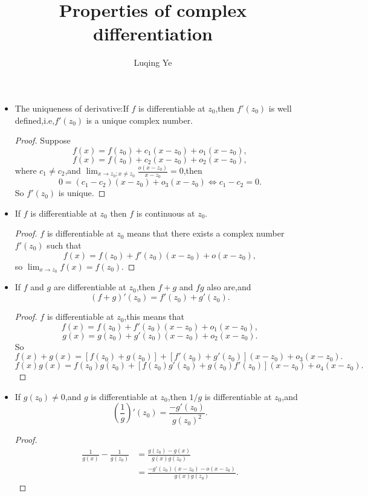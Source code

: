 \documentclass{amsart}
\theoremstyle{plain}
\theoremstyle{definition}
\begin{document}
\title{Properties of complex differentiation}

\author{Luqing Ye}
\address{College of Science, Hangzhou Normal University,Hangzhou City,Zhejiang Province,China}

\maketitle

\setcounter{tocdepth}{2}
\begin{itemize}
\item The uniqueness of derivative:If $f$ is differentiable at
  $z_0$,then $f'(z_0)$ is well defined,i.e,$f'(z_0)$ is a unique
  complex number.
  \begin{proof}
Suppose
$$
f(x)=f(z_0)+c_1(x-z_0)+o_1(x-z_0),
$$
$$
f(x)=f(z_0)+c_2(x-z_0)+o_2(x-z_0),
$$
where $c_1\neq c_2$,and $\lim_{x\to z_0;x\neq
  z_0}\frac{o(x-z_0)}{x-z_0}=0$,then 
$$
0=(c_1-c_2)(x-z_0)+o_3(x-z_0) \iff c_1-c_2=0.
$$
So $f'(z_0)$ is unique.
  \end{proof}
\item If $f$ is differentiable at $z_0$ then $f$ is continuous at
  $z_0$.
  \begin{proof}
    $f$ is differentiable at $z_0$ means that there exists a complex
    number $f'(z_0)$ such that
$$
f(x)=f(z_0)+f'(z_0) (x-z_0)+o(x-z_0),
$$
so
$\lim_{x\to z_0}f(x)=f(z_0)$.
  \end{proof}
\item If $f$ and $g$ are differentiable at $z_0$,then $f+g$ and $fg$
  also are,and 
$$
(f+g)'(z_0)=f'(z_0)+g'(z_0).
$$
\begin{proof}
  $f$ is differentiable at $z_0$,this means that
$$
f(x)=f(z_0)+f'(z_0)(x-z_0)+o_{1}(x-z_0),
$$
$$
g(x)=g(z_0)+g'(z_0)(x-z_0)+o_{2}(x-z_0).
$$
So
$$
f(x)+g(x)=[f(z_0)+g(z_0)]+[f'(z_0)+g'(z_0)](x-z_0)+o_3(x-z_0).
$$
$$
f(x)g(x)=f(z_0)g(z_0)+[f(z_0)g'(z_0)+g(z_0)f'(z_0)](x-z_0)+o_4(x-z_0).
$$
\end{proof}
\item If $g(z_0)\neq 0$,and $g$ is differentiable at $z_0$,then
  $1/g$ is differentiable at $z_0$,and 
$$
\left (\frac{1}{g}\right)'(z_0)=\frac{-g'(z_0)}{g(z_0)^2}.
$$
\begin{proof}
\begin{align*}
\frac{1}{g(x)}-\frac{1}{g(z_0)}&=\frac{g(z_0)-g(x)}{g(x)g(z_0)}\\&=\frac{-g'(z_0)(x-z_0)-o(x-z_0)}{g(x)g(z_0)}.
\end{align*}

\end{proof}
\end{itemize}
\end{document}
